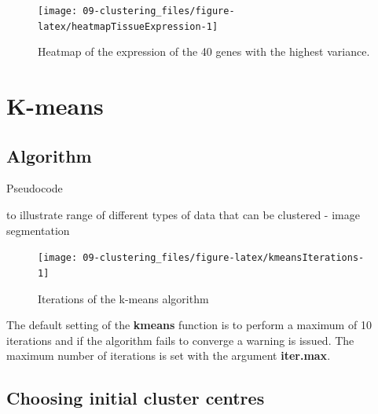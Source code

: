 \documentclass[]{book}
\theoremstyle{definition}
\theoremstyle{definition}
\theoremstyle{definition}
\theoremstyle{remark}
\begin{document}
\begin{figure}

{\centering \texttt{[image: 09-clustering\_files/figure-latex/heatmapTissueExpression-1]} 

}

\caption{Heatmap of the expression of the 40 genes with the highest variance.}\label{fig:heatmapTissueExpression}
\end{figure}

\section{K-means}\label{k-means}

\subsection{Algorithm}\label{algorithm}

Pseudocode

to illustrate range of different types of data that can be clustered -
image segmentation

\begin{figure}

{\centering \texttt{[image: 09-clustering\_files/figure-latex/kmeansIterations-1]} 

}

\caption{Iterations of the k-means algorithm}\label{fig:kmeansIterations}
\end{figure}

The default setting of the \textbf{kmeans} function is to perform a
maximum of 10 iterations and if the algorithm fails to converge a
warning is issued. The maximum number of iterations is set with the
argument \textbf{iter.max}.

\subsection{Choosing initial cluster
centres}\label{choosing-initial-cluster-centres}
\end{document}
